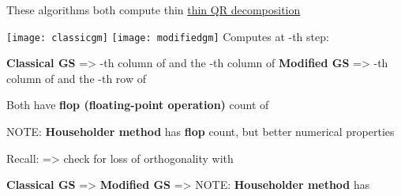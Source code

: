 \begin{itemize}

      \vItem
            These algorithms both compute thin \underline{thin QR decomposition}

            \texttt{[image: classicgm]}
            \texttt{[image: modifiedgm]}
      \vItem
            Computes at -th step:

            \begin{itemize}

                  \vItem
                        \textbf{Classical GS} => -th column of
                         and the -th column of 
                  \vItem
                        \textbf{Modified GS} => -th column of
                         and the -th row of 
            \end{itemize}
      \vItem
            Both have \textbf{flop (floating-point operation)} count of

            \begin{itemize}

                  \vItem
                        NOTE: \textbf{Householder method} has
                         \textbf{flop} count,
                        but better numerical properties
            \end{itemize}
      \vItem
            Recall:  =>
            check for loss of orthogonality with

            \begin{itemize}

                  \vItem
                        \textbf{Classical GS} =>
                  \vItem
                        \textbf{Modified GS} =>
                  \vItem
                        NOTE: \textbf{Householder method} has
            \end{itemize}
\end{itemize}

